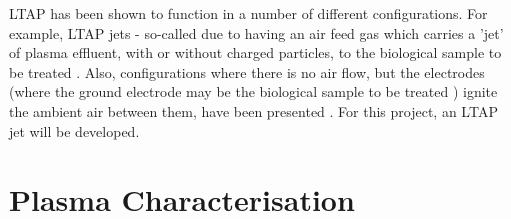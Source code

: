 \documentclass[11pt, oneside]{article}   	%
\begin{document}
LTAP has been shown to function in a number of different configurations.
For example, LTAP jets - so-called due to having an air feed gas which carries a 'jet' of plasma effluent, with or without charged particles, to the biological sample to be treated \cite{Kolb2008cold, Chen2009blood}.
Also, configurations where there is no air flow, but the electrodes (where the ground electrode may be the biological sample to be treated \cite{Fridman2007floating}) ignite the ambient air between them, have been presented \cite{Laroussi2004evaluation}. 
For this project, an LTAP jet will be developed.

%

%
\section*{Plasma Characterisation}
\end{document}
